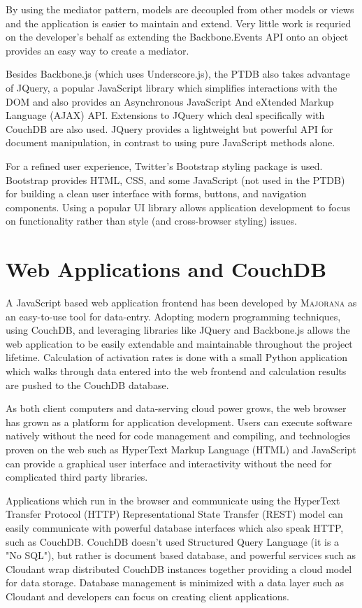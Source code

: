 \documentclass[journal]{IEEEtran}
\begin{document}
By using the mediator pattern, models are decoupled from other models or views and the
application is easier to maintain and extend. Very little work is requried on the 
developer's behalf as extending the Backbone.Events API onto an object provides an
easy way to create a mediator.

Besides Backbone.js (which uses Underscore.js), the PTDB also takes advantage of JQuery,
a popular JavaScript library which simplifies interactions with the DOM and also provides
an Asynchronous JavaScript And eXtended Markup Language (AJAX) API. Extensions to JQuery which deal specifically with CouchDB are also used.
JQuery provides a lightweight but powerful API for document manipulation, in contrast to
using pure JavaScript methods alone.

For a refined user experience, Twitter's Bootstrap styling package is used. Bootstrap 
provides HTML, CSS, and some JavaScript (not used in the PTDB) for building a clean
user interface with forms, buttons, and navigation components. Using a popular UI 
library allows application development to focus on functionality rather than style (and
cross-browser styling) issues.

\section{Web Applications and CouchDB}
A JavaScript based web application frontend has been developed by \textsc{Majorana} as an easy-to-use tool for data-entry.
Adopting modern programming techniques, using CouchDB, and leveraging libraries like JQuery and Backbone.js allows the
web application to be easily extendable and maintainable throughout the project lifetime. Calculation of
activation rates is done with a small Python application which walks through data entered into the web
frontend and calculation results are pushed to the CouchDB database.

As both client computers and data-serving cloud power grows, the web browser has grown as a
platform for application development. Users can execute software natively without
the need for code management and compiling, and technologies proven on the web such as HyperText Markup Language (HTML)
and JavaScript can provide a graphical user interface and interactivity without the need
for complicated third party libraries. 

Applications which run in the browser and communicate using the HyperText Transfer Protocol (HTTP) Representational State Transfer
(REST) model can easily communicate with powerful database interfaces which also speak HTTP, such as
CouchDB. CouchDB doesn't used Structured Query Language (it is a "No SQL"), but 
rather is document based database, and powerful services such as Cloudant wrap
distributed CouchDB instances together providing a cloud model for data storage. Database management
is minimized with a data layer such as Cloudant and developers can focus on creating client applications.
\end{document}
